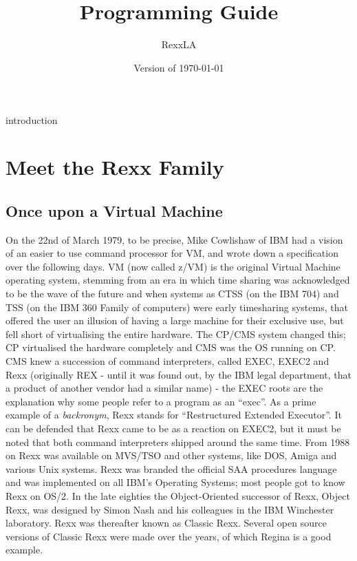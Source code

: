 
 
\renewcommand{\isbn}{978-90-819090-0-6}
\setcounter{tocdepth}{1} 
\title{\nr{}\protect\\Programming Guide}
\author{RexxLA}
\date{Version \nrversion{} of \today}
\maketitle
{}
\pagestyle{plain}
\frontmatter
{}
\pagestyle{plain}

\tableofcontents
\newpage
{}
\frontmatter
\large


 {introduction}
\mainmatter
\chapter{Meet the Rexx Family}
\section{Once upon a Virtual Machine}
On the 22nd of March 1979, to be precise, Mike Cowlishaw of IBM had a
vision of an easier to use command processor for VM, and wrote down a
specification over the following days.
VM\textsuperscript{\texttrademark} (now called z/VM) is the original Virtual Machine operating system,  stemming from an
era in which time sharing was acknowledged to be the wave of the
future and when systems as CTSS (on the IBM 704) and TSS (on the IBM
360 Family of computers) were early timesharing systems, that offered
the user an illusion of having a large machine for their exclusive
use, but fell short of virtualising the entire hardware. The CP/CMS
system changed this; CP virtualised the hardware completely and CMS was the OS
running on CP. CMS knew a succession of command interpreters, called
EXEC, EXEC2 and Rexx\textsuperscript{\texttrademark}  (originally REX
- until it was found out, by the IBM legal department, that a product of another vendor had a similar name) -
the EXEC roots are the explanation why some people refer to a \nr{}
program as an ``exec''. As a prime example of a \emph{backronym}, Rexx
stands for ``Restructured Extended Executor''. It
can be defended that Rexx came to be as a reaction on EXEC2, but it
must be noted that both command interpreters shipped around the same
time. From 1988 on Rexx was available on MVS/TSO and other systems,
like DOS, Amiga and various Unix systems. Rexx was branded the
official SAA procedures language and was implemented on all IBM's
Operating Systems; most people got to know Rexx on OS/2. In the late
eighties the Object-Oriented successor of Rexx, Object Rexx, was
designed by Simon Nash and his colleagues in the IBM Winchester
laboratory. Rexx was thereafter known as Classic Rexx. Several open
source versions of Classic Rexx were made over the years, of which
Regina is a good example.

